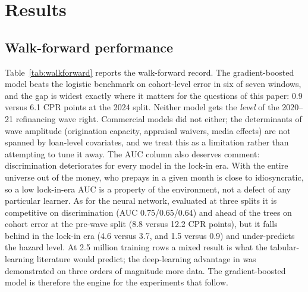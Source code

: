 \documentclass[11pt]{article}
\begin{document}
\section{Results}
\label{sec:results}

\subsection{Walk-forward performance}

Table~\ref{tab:walkforward} reports the walk-forward record. The gradient-boosted model beats
the logistic benchmark on cohort-level error in six of seven windows, and the gap is widest
exactly where it matters for the questions of this paper: 0.9 versus 6.1 CPR points at the 2024
split. Neither model gets the \emph{level} of the 2020--21 refinancing wave right. Commercial
models did not either; the determinants of wave amplitude (origination capacity, appraisal
waivers, media effects) are not spanned by loan-level covariates, and we treat this as a
limitation rather than attempting to tune it away. The AUC column also deserves comment: discrimination
deteriorates for every model in the lock-in era. With the entire universe out of the money, who
prepays in a given month is close to idiosyncratic, so a low lock-in-era AUC is a property of
the environment, not a defect of any particular learner. As for the neural network, evaluated
at three splits it is competitive on discrimination (AUC 0.75/0.65/0.64) and ahead of the trees
on cohort error at the pre-wave split (8.8 versus 12.2 CPR points), but it falls behind in the
lock-in era (4.6 versus 3.7, and 1.5 versus 0.9) and under-predicts the hazard level. At 2.5
million training rows a mixed result is what the tabular-learning literature would predict;
the deep-learning advantage in \citet{sadhwani2021deep} was demonstrated on three orders of
magnitude more data. The gradient-boosted model is therefore the engine for the experiments
that follow.
\end{document}
